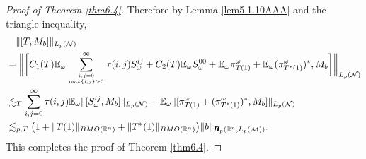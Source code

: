 \documentclass[oneside,english,a4wide]{amsart}
\numberwithin{equation}{section}
\numberwithin{figure}{section}
\theoremstyle{plain}
\theoremstyle{plain}
\theoremstyle{definition}
\theoremstyle{plain}
\theoremstyle{remark}
\theoremstyle{definition}
\theoremstyle{remark}
\theoremstyle{definition}
\newcommand{\8}{\infty}
\begin{document}
\begin{proof}[Proof of Theorem \ref{thm6.4}]
Therefore by Lemma \ref{lem5.1.10AAA} and the triangle inequality,
\begin{equation*}
	\begin{aligned}
		{}&\quad\|[T,M_b]\|_{L_p(\mathcal{N})}\\
		&=\biggl\|\biggl[C_1(T)\mathbb{E}_\omega\sum_{i,j=0\atop \max\{i,j\}>0}^\infty \tau(i,j)S_\omega^{ij}+C_2(T)\mathbb{E}_\omega S_\omega^{00}+\mathbb{E}_\omega \pi^\omega_{T(1)}+\mathbb{E}_\omega (\pi^\omega_{T^*(1)})^*,M_b\biggr]\biggr\|_{L_p(\mathcal{N})}\\
		&\lesssim_T \sum_{i,j=0}^\infty \tau(i,j)\mathbb{E}_\omega\|[S_\omega^{ij},M_b]\|_{L_p(\mathcal{N})}+\mathbb{E}_\omega\|[ \pi^\omega_{T(1)}+ (\pi^\omega_{T^*(1)})^*,M_b]\|_{L_p(\mathcal{N})} \\
		&\lesssim_{p, T} \big(1+\|T(1)\|_{BMO(\mathbb{R}^n)}+\|T^*(1)\|_{BMO(\mathbb{R}^n)}\big) \|b\|_{\pmb{B}_p(\mathbb{R}^n,L_p(\mathcal{M}))}.
	\end{aligned}
\end{equation*}
This completes the proof of Theorem \ref{thm6.4}.
\end{proof}	
\end{document}
